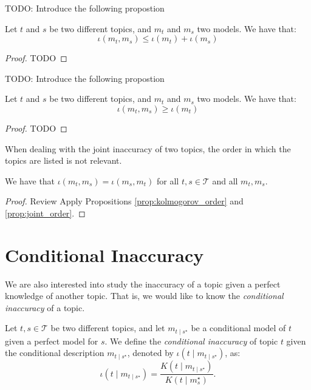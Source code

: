 {\color{red} TODO: Introduce the following propostion}

\begin{proposition}
Let $t$ and $s$ be two different topics, and $m_t$ and $m_s$ two models. We have that:
\[
\iota(m_t, m_s) \leq \iota(m_t) + \iota(m_s)
\]
\end{proposition}
\begin{proof}
{\color{red} TODO}
\end{proof}

{\color{red} TODO: Introduce the following propostion}

\begin{proposition}
Let $t$ and $s$ be two different topics, and $m_t$ and $m_s$ two models. We have that:
\[
\iota(m_t, m_s) \geq \iota(m_t)
\]
\end{proposition}
\begin{proof}
{\color{red} TODO}
\end{proof}

When dealing with the joint inaccuracy of two topics, the order in which the topics are listed is not relevant.

\begin{proposition}
We have that $\iota(m_t, m_s) = \iota(m_s, m_t)$ for all $t,s \in \mathcal{T}$ and all $m_t, m_s$.
\end{proposition}
\begin{proof}
{\color{red} Review}
Apply Propositions \ref{prop:kolmogorov_order} and \ref{prop:joint_order}.
\end{proof}

%
%

\section{Conditional Inaccuracy}

We are also interested into study the inaccuracy of a topic given a perfect knowledge of another topic. That is, we would like to know the \emph{conditional inaccuracy} of a topic.

\begin{definition}
Let $t,s \in \mathcal{T}$ be two different topics, and let $m_{t \mid s^\star}$ be a conditional model of $t$ given a perfect model for $s$. We define the \emph{conditional inaccuracy} of topic $t$ given the conditional description $m_{t \mid s^\star}$, denoted by $\iota(t \mid m_{t \mid s^\star})$, as: 
\[
\iota( t \mid m_{t \mid s^\star}) = \frac{ K \left(t \mid m_{t \mid s^\star} \right) } {K(t \mid m^\star_s)}.
\]
\end{definition}

